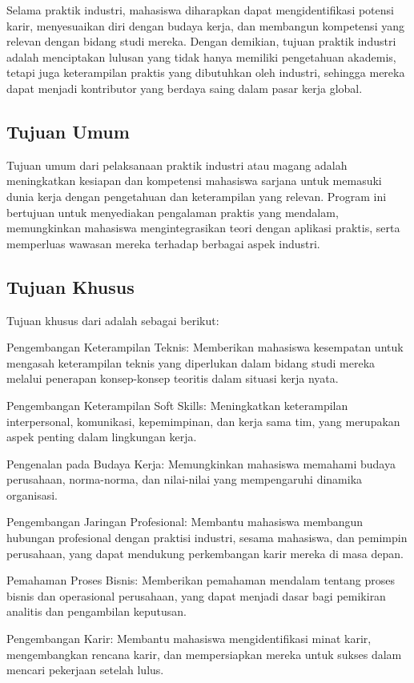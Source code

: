 Selama praktik industri, mahasiswa diharapkan dapat mengidentifikasi potensi karir, menyesuaikan diri dengan budaya kerja, dan membangun kompetensi yang relevan dengan bidang studi mereka. Dengan demikian, tujuan praktik industri adalah menciptakan lulusan yang tidak hanya memiliki pengetahuan akademis, tetapi juga keterampilan praktis yang dibutuhkan oleh industri, sehingga mereka dapat menjadi kontributor yang berdaya saing dalam pasar kerja global.

\subsection{Tujuan Umum}

Tujuan umum dari pelaksanaan praktik industri atau magang adalah meningkatkan kesiapan dan kompetensi mahasiswa sarjana untuk memasuki dunia kerja dengan pengetahuan dan keterampilan yang relevan. Program ini bertujuan untuk menyediakan pengalaman praktis yang mendalam, memungkinkan mahasiswa mengintegrasikan teori dengan aplikasi praktis, serta memperluas wawasan mereka terhadap berbagai aspek industri.

\subsection{Tujuan Khusus}

Tujuan khusus dari \tipe adalah sebagai berikut:

\begin{packed_enum}
	\item Pengembangan Keterampilan Teknis: Memberikan mahasiswa kesempatan untuk mengasah keterampilan teknis yang diperlukan dalam bidang studi mereka melalui penerapan konsep-konsep teoritis dalam situasi kerja nyata.
	\item Pengembangan Keterampilan Soft Skills: Meningkatkan keterampilan interpersonal, komunikasi, kepemimpinan, dan kerja sama tim, yang merupakan aspek penting dalam lingkungan kerja.
	\item Pengenalan pada Budaya Kerja: Memungkinkan mahasiswa memahami budaya perusahaan, norma-norma, dan nilai-nilai yang mempengaruhi dinamika organisasi.
	\item Pengembangan Jaringan Profesional: Membantu mahasiswa membangun hubungan profesional dengan praktisi industri, sesama mahasiswa, dan pemimpin perusahaan, yang dapat mendukung perkembangan karir mereka di masa depan.
	\item Pemahaman Proses Bisnis: Memberikan pemahaman mendalam tentang proses bisnis dan operasional perusahaan, yang dapat menjadi dasar bagi pemikiran analitis dan pengambilan keputusan.
	\item Pengembangan Karir: Membantu mahasiswa mengidentifikasi minat karir, mengembangkan rencana karir, dan mempersiapkan mereka untuk sukses dalam mencari pekerjaan setelah lulus.
\end{packed_enum}

